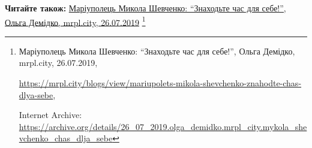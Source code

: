  
 
 
 
 

\def\pubIA{https://archive.org/details/26_07_2019.olga_demidko.mrpl_city.mykola_shevchenko_chas_dlja_sebe}
\def\pubTitle{Маріуполець Микола Шевченко: \enquote{Знаходьте час для себе!}}
\def\pubDate{26.07.2019}
\def\pubOrigin{https://mrpl.city/blogs/view/mariupolets-mikola-shevchenko-znahodte-chas-dlya-sebe}
\def\pubAuthor{Ольга Демідко}

\textbf{Читайте також:} \href{\pubIA}{%
\pubTitle, \pubAuthor, mrpl.city, \pubDate}%
\footnote{\pubTitle, \pubAuthor, mrpl.city, \pubDate, \par\url{\pubOrigin}, \par Internet Archive: \url{\pubIA}}
